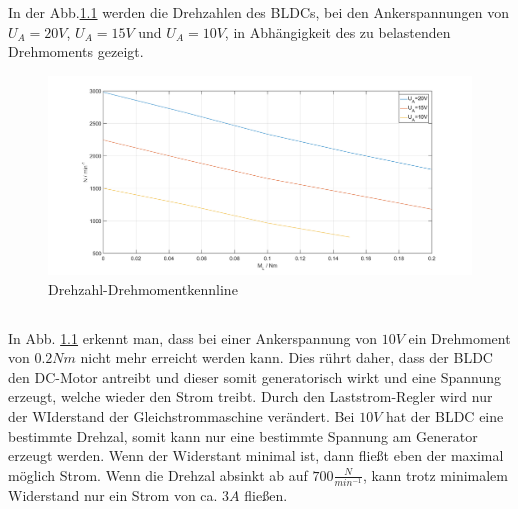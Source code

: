 \chapter{}\label{ex:aufg5}
%
\section{}\label{sec:aufg5a}
%
In der Abb.\ref{fig:drehzahldrehm} werden die Drehzahlen des BLDCs, bei den Ankerspannungen von $U_A = 20V$, $U_A = 15V$ und $U_A = 10V$, in Abhängigkeit des zu belastenden Drehmoments gezeigt.

\begin{figure}[htb]
	\includegraphics[width = \textwidth]{./Bilder/Drehzahldrehmomentkennlinie}
	\caption{Drehzahl-Drehmomentkennline}
	\label{fig:drehzahldrehm}
\end{figure}
%
\section{}\label{sec:aufg5b}
%
In Abb. \ref{fig:drehzahldrehm} erkennt man, dass bei einer Ankerspannung von $10V$ ein Drehmoment von $0.2 Nm$ nicht mehr erreicht werden kann. Dies rührt daher, dass der BLDC den DC-Motor antreibt und dieser somit generatorisch wirkt und eine Spannung erzeugt, welche wieder den Strom treibt. Durch den Laststrom-Regler wird nur der WIderstand der Gleichstrommaschine verändert. Bei $10V$ hat der BLDC eine bestimmte Drehzal, somit kann nur eine bestimmte Spannung am Generator erzeugt werden. Wenn der Widerstant minimal ist, dann fließt eben der maximal möglich Strom. Wenn die Drehzal absinkt ab auf $700 \frac{N}{min^{-1}}$, kann trotz minimalem Widerstand nur ein Strom von ca. $3A$ fließen.